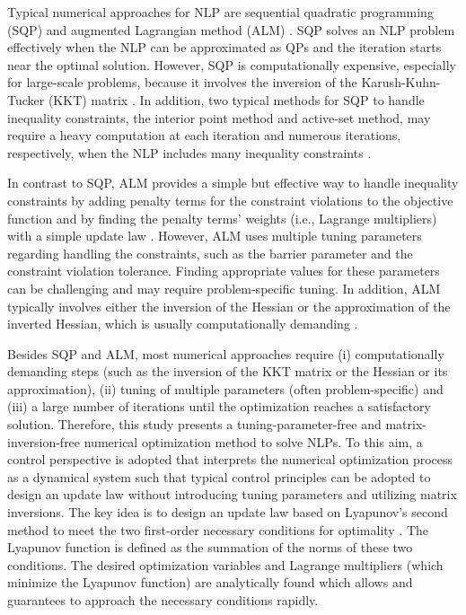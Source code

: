 \documentclass[journal]{IEEEtranTIE}
\begin{document}
Typical numerical approaches for NLP are sequential quadratic programming (SQP) and augmented Lagrangian method (ALM) \cite{pendeza2020hopfield}. SQP solves an NLP problem effectively when the NLP can be approximated as QPs and the iteration starts near the optimal solution. However, SQP is computationally expensive, especially for large-scale problems, because it involves the inversion of the Karush-Kuhn-Tucker (KKT) matrix \cite{jorge2006numerical}. In addition, two typical methods for SQP to handle inequality constraints, the interior point method and active-set method, may require a heavy computation at each iteration and numerous iterations, respectively, when the NLP includes many inequality constraints \cite{jorge2006numerical}.

In contrast to SQP, ALM provides a simple but effective way to handle inequality constraints by adding penalty terms for the constraint violations to the objective function and by finding the penalty terms' weights (i.e., Lagrange multipliers) with a simple update law \cite{jorge2006numerical}. However, ALM uses multiple tuning parameters regarding handling the constraints, such as the barrier parameter and the constraint violation tolerance. Finding appropriate values for these parameters can be challenging and may require problem-specific tuning. In addition, ALM typically involves either the inversion of the Hessian or the approximation of the inverted Hessian, which is usually computationally demanding \cite{srivastava2020nesterov}.

Besides SQP and ALM, most numerical approaches require (i) computationally demanding steps (such as the inversion of the KKT matrix or the Hessian or its approximation), (ii) tuning of multiple parameters (often problem-specific) and (iii) a large number of iterations until the optimization reaches a satisfactory solution. Therefore, this study presents a tuning-parameter-free and matrix-inversion-free numerical optimization method to solve NLPs. To this aim, a control perspective is adopted that interprets the numerical optimization process as a dynamical system such that typical control principles can be adopted to design an update law without introducing tuning parameters and utilizing matrix inversions. The key idea is to design an update law based on Lyapunov's second method to meet the two first-order necessary conditions for optimality \cite{jorge2006numerical}. The Lyapunov function is defined as the summation of the norms of these two conditions. The desired optimization variables and Lagrange multipliers (which minimize the Lyapunov function) are analytically found which allows and guarantees to approach the necessary conditions rapidly.
\end{document}
